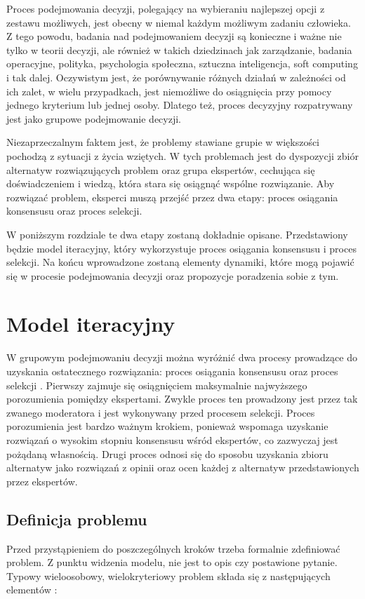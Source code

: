 Proces podejmowania decyzji, polegający na wybieraniu najlepszej opcji z 
zestawu możliwych, jest obecny w niemal każdym możliwym zadaniu człowieka. Z
tego powodu, badania nad podejmowaniem decyzji są konieczne i ważne nie tylko w 
teorii decyzji, ale również w takich dziedzinach jak zarządzanie, badania
operacyjne,  polityka, psychologia społeczna, sztuczna inteligencja, soft 
computing i tak dalej. Oczywistym jest, że porównywanie różnych działań w 
zależności od ich zalet, w wielu przypadkach, jest niemożliwe do osiągnięcia 
przy pomocy jednego kryterium lub jednej osoby. Dlatego też, proces decyzyjny 
rozpatrywany jest jako grupowe podejmowanie decyzji.

Niezaprzeczalnym faktem jest, że problemy stawiane grupie w większości pochodzą 
z sytuacji z życia wziętych. W tych problemach jest do dyspozycji zbiór
alternatyw rozwiązujących problem oraz grupa ekspertów, cechująca się
doświadczeniem i wiedzą, która stara się osiągnąć wspólne rozwiązanie. Aby
rozwiązać problem, eksperci muszą przejść przez dwa etapy: proces osiągania
konsensusu oraz proces selekcji.

W poniższym rozdziale te dwa etapy zostaną dokładnie opisane. Przedstawiony
będzie model iteracyjny, który wykorzystuje proces osiągania konsensusu i proces
selekcji. Na końcu wprowadzone zostaną elementy dynamiki, które mogą pojawić się
w procesie podejmowania decyzji oraz propozycje poradzenia sobie z tym.

\section{Model iteracyjny}
W grupowym podejmowaniu decyzji można wyróżnić dwa procesy prowadzące do
uzyskania ostatecznego rozwiązania: proces osiągania konsensusu oraz proces
selekcji \cite{Herrera1996,Alonso2009}. Pierwszy zajmuje się osiągnięciem
maksymalnie najwyższego porozumienia pomiędzy ekspertami. Zwykle proces ten
prowadzony jest przez tak zwanego moderatora i jest wykonywany przed procesem
selekcji. Proces porozumienia jest bardzo ważnym krokiem, ponieważ wspomaga
uzyskanie rozwiązań o wysokim stopniu konsensusu wśród  ekspertów, co zazwyczaj
jest pożądaną własnością. Drugi proces odnosi się do sposobu uzyskania zbioru
alternatyw jako rozwiązań z opinii oraz ocen każdej z alternatyw przedstawionych
przez ekspertów.

\subsection{Definicja problemu}
Przed przystąpieniem do poszczególnych kroków trzeba formalnie zdefiniować 
problem. Z punktu widzenia modelu, nie jest to opis czy postawione pytanie. 
Typowy wieloosobowy, wielokryteriowy problem składa się z następujących 
elementów \cite{Ekel2009}:

